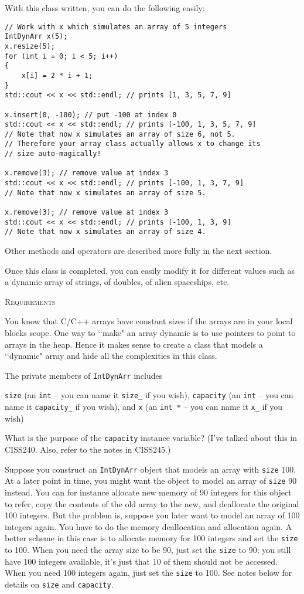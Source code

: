 With this class written, you can do the following easily:
\begin{Verbatim}[frame=single]
// Work with x which simulates an array of 5 integers
IntDynArr x(5);
x.resize(5);
for (int i = 0; i < 5; i++)
{
    x[i] = 2 * i + 1;
}
std::cout << x << std::endl; // prints [1, 3, 5, 7, 9]

x.insert(0, -100); // put -100 at index 0
std::cout << x << std::endl; // prints [-100, 1, 3, 5, 7, 9]
// Note that now x simulates an array of size 6, not 5.
// Therefore your array class actually allows x to change its
// size auto-magically!

x.remove(3); // remove value at index 3
std::cout << x << std::endl; // prints [-100, 1, 3, 7, 9]
// Note that now x simulates an array of size 5.

x.remove(3); // remove value at index 3
std::cout << x << std::endl; // prints [-100, 1, 3, 9]
// Note that now x simulates an array of size 4.
\end{Verbatim}
Other methods and operators are described more fully in 
the next section. 

Once this class is completed, you can easily modify it for 
different values such as a dynamic array of strings, of 
doubles, of alien spaceships, etc.


\newpage
\textsc{Requirements}

You know that C/C++ arrays have constant sizes if the 
arrays are in your local blocks scope. One way to 
\lq\lq make" an array dynamic is to use pointers to point 
to arrays in the heap. Hence it makes sense to create a 
class that models a \lq\lq dynamic" array and hide all 
the complexities in this class. 

The private members of \verb!IntDynArr! includes 
\begin{tightlist}
\li \verb!size! (an \verb!int! -- you can name it \verb!size_! if you wish), 
\li \verb!capacity! (an \verb!int! -- you can name it \verb!capacity_! if you wish), and
\li \verb!x! (an \verb!int *! -- you can name it \verb!x_! if you wish)
\end{tightlist}

What is the purpose of the \verb!capacity! instance variable? 
(I've talked about this in CISS240. Also, refer to the notes 
in CISS245.)

Suppose you construct an \verb!IntDynArr! object that models 
an array with \verb!size! 100. At a later point in time, you might 
want the object to model an array of \verb!size! 90 instead. You 
can for instance allocate new memory of 90 integers for this 
object to refer, copy the contents of the old array to the 
new, and deallocate the original 100 integers. But the 
problem is, suppose you later want to model an array of 100 
integers again. You have to do the memory deallocation and 
allocation again. A better scheme in this case is to allocate 
memory for 100 integers and set the \verb!size! to 100. When you need 
the array size to be 90, just set the \verb!size! to 90; you still have 
100 integers available, it's just that 10 of them should not be 
accessed. When you need 100 integers again, just set the \verb!size! to 
100. See notes below for details on \verb!size! and \verb!capacity!.

